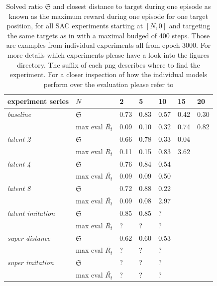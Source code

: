 \begin{table}
    \begin{center}
        \begin{tabular}{ l l | l l l l l}
        experiment series           & $N$                   & 2    & 5    & 10   & 15   & 20   \\
        \hline
        \hline
        \textit{baseline}           & $\mathfrak{S}$        & 0.73 & 0.83 & 0.57 & 0.42 & 0.30 \\
                                    & max eval $\bar{R_t}$  & 0.09 & 0.10 & 0.32 & 0.74 & 0.82 \\
        \hline
        \textit{latent 2}           & $\mathfrak{S}$        & 0.66 & 0.78 & 0.33 & 0.04 &      \\
                                    & max eval $\bar{R_t}$  & 0.11 & 0.15 & 0.83 & 3.62 &      \\
        \hline
        \textit{latent 4}           & $\mathfrak{S}$        & 0.76 & 0.84 & 0.54 &      &      \\
                                    & max eval $\bar{R_t}$  & 0.09 & 0.09 & 0.50 &      &      \\
        \hline
        \textit{latent 8}           & $\mathfrak{S}$        & 0.72 & 0.88 & 0.22 &      &      \\
                                    & max eval $\bar{R_t}$  & 0.09 & 0.08 & 2.97 &      &      \\
        \hline
        \textit{latent imitation}   & $\mathfrak{S}$        & 0.85 & 0.85 & ?    &      &      \\
                                    & max eval $\bar{R_t}$  & ?    & ?    & ?    &      &      \\
        \hline
        \textit{super distance}     & $\mathfrak{S}$        & 0.62 & 0.60 & 0.53 &      &      \\
                                    & max eval $\bar{R_t}$  & ?    & ?    & ?    &      &      \\
        \hline
        \textit{super imitation}    & $\mathfrak{S}$        & ?    & ?    & ?    &      &      \\
                                    & max eval $\bar{R_t}$  & ?    & ?    & ?    &      &      \\
    \end{tabular}
    \end{center}
    \caption[SAC Solved ratio]{Solved ratio $\mathfrak{S}$ and closest distance to target during one episode as known as the maximum reward during one episode for one target position, for all SAC experiments starting at $[N, 0]$ and targeting the same targets as in  with a maximal budged of 400 steps. Those are examples from individual experiments all from epoch 3000. For more details which experiments please have a look into the figures directory. The suffix of each png describes where to find the experiment. For a closer inspection of how the individual models perform over the evaluation please refer to }
    \label{tab:SAC_solved_ratio}
\end{table}

